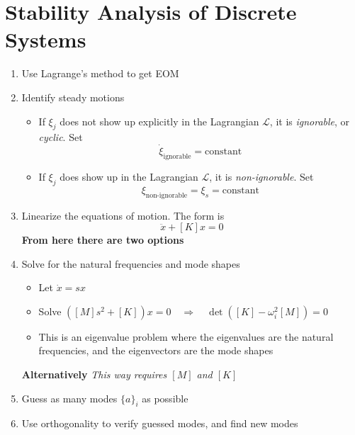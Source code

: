 \documentclass[letterpaper,twocolumn,notitlepage]{article}
\begin{document}
  \section*{Stability Analysis of Discrete Systems}

  \begin{enumerate}
    \item{Use Lagrange's method to get EOM}
    \item{Identify steady motions}
    \begin{itemize}
      \item{%
        If $\xi_{j}$ does not show up explicitly in the Lagrangian $\mathscr{L}$, it is \textit{ignorable}, or \textit{cyclic}.
        Set
      }
      \begin{equation*}
        \dot{\xi}_{\text{ignorable}}=\text{constant}
      \end{equation*}
      \item{%
        If $\xi_{j}$ does show up in the Lagrangian $\mathscr{L}$, it is \textit{non-ignorable}.
        Set
      }
      \begin{equation*}
        \xi_{\text{non-ignorable}}=\xi_{s}=\text{constant}
      \end{equation*}
    \end{itemize}
    \item{%
      Linearize the equations of motion.
      The form is
    }
    \begin{equation*}
      [M]\ddot{x}+[K]x=0
    \end{equation*}
    \textbf{From here there are two options}
    \item{Solve for the natural frequencies and mode shapes}
    \begin{itemize}
      \item{Let $\dot{x}=sx$}
      \item{Solve $\left([M]s^{2}+[K]\right)x=0\quad\Rightarrow\quad\boxed{\det\left([K]-\omega_{i}^{2}[M]\right)=0}$}
      \item{This is an eigenvalue problem where the eigenvalues are the natural frequencies, and the eigenvectors are the mode shapes}
    \end{itemize}
    \textbf{Alternatively}
    \textit{This way requires $[M]$ and $[K]$}
    \item{Guess as many modes $\{a\}_{i}$ as possible}
    \item{Use orthogonality to verify guessed modes, and find new modes}
    \begin{equation*}

\end{equation*}
\end{enumerate}
\end{document}
